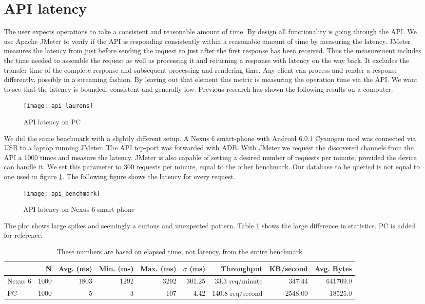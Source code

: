 \section{API latency}
The user expects operations to take a consistent and reasonable amount of time.
By design all functionality is going through the API.
We use Apache JMeter to verify if the API is responding consistently within a reasonable amount of time by measuring the latency.
JMeter measures the latency from just before sending the request to just after the first response has been received. \cite{jmeter_glossary}
Thus the measurement includes the time needed to assemble the request as well as processing it and returning a response with latency on the way back.
It excludes the transfer time of the complete response and subsequent processing and rendering time.
Any client can process and render a response differently, possibly in a streaming fashion.
By leaving out that element this metric is measuring the operation time via the API.
We want to see that the latency is bounded, consistent and generally low.
Previous research has shown the following results on a computer:
\begin{figure}[H]
	\centering %
	\texttt{[image: api\_laurens]}
	\caption{API latency on PC}
	\label{fig:api_laurens}
\end{figure}
We did the same benchmark with a slightly different setup.
A Nexus 6 smart-phone with Android 6.0.1 Cyanogen mod was connected via USB to a laptop running JMeter.
The API tcp-port was forwarded with ADB.
With JMeter we request the discovered channels from the API a 1000 times and measure the latency.
JMeter is also capable of setting a desired number of requests per minute, provided the device can handle it.
We set this parameter to 300 requests per minute, equal to the other benchmark.
Our database to be queried is not equal to one used in figure \ref{fig:api_laurens}.
The following figure shows the latency for every request.
\begin{figure}[H]
	\centering
	\texttt{[image: api\_benchmark]}
	\caption{API latency on Nexus 6 smart-phone}
	\label{fig:api_benchmark}
\end{figure}
The plot shows large spikes and seemingly a curious and unexpected pattern.
Table \ref{table:api_benchmark} shows the large difference in statistics.
PC is added for reference.
\begin{table}
  \begin{tabular}{l | *{8}{r}} \hline
  	 & N & Avg. (ms) & Min. (ms) & Max. (ms) & $\sigma$ (ms) & Throughput & KB/second & Avg. Bytes \\ \hline \hline
	Nexus 6 & 1000 & 1803 & 1292 & 3292 & 301.25 & 33.3 req/minute & 347.44 & 641709.0 \\ \hline
	PC         & 1000 & 5        & 3      & 107   & 4.42     & 140.8 req/second & 2548.00 & 18525.0 \\ \hline
  \end{tabular}
  \caption{These numbers are based on elapsed time, not latency, from the entire benchmark}
  \label{table:api_benchmark}
\end{table}
